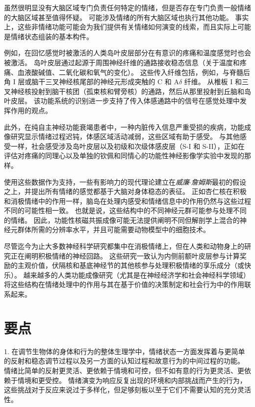 虽然很明显没有大脑区域专门负责任何特定的情绪，但是否存在专门负责一般情绪的大脑区域甚至值得怀疑。
可能涉及情绪的所有大脑区域也执行其他功能。
事实上，这些非情绪功能可能会为我们提供有关情绪如何演变的线索，而且实际上可能是情绪状态组装的基本构件。


例如，在回忆感觉时被激活的人类岛叶皮层部分在有意识的疼痛和温度感觉时也会被激活。
岛叶皮层通过起源于周围神经纤维的通路接收稳态信息（关于温度和疼痛、血液酸碱值、二氧化碳和氧气的变化）。
这些传入纤维包括，例如，与脊髓后角 I 层或脑干三叉神经核尾部的神经元形成突触的 C 和 A$ \delta $ 纤维。
从椎板 I 和三叉神经核投射到脑干核团（孤束核和臂旁核）的通路，然后从那里投射到丘脑和岛叶皮层。
该功能系统的识别进一步支持了传入体感通路中的信号在感觉处理中发挥作用的观点。


此外，在纯自主神经功能衰竭患者中，一种内脏传入信息严重受损的疾病，功能成像研究显示情绪过程迟钝，体感区域活动减弱，这些区域有助于感受。
与其他感受一样，社会感受涉及岛叶皮层以及初级和次级体感皮层（S-I 和 S-II），正如在评估对疼痛的同理心以及单独的钦佩和同情心的功能性神经影像学实验中发现的那样。


使用这些数据作为支持，一些有影响力的现代理论建立在\textit{威廉$\cdot$詹姆斯}最初的假设之上，并提出所有情绪的感觉都基于大脑对身体稳态的表征。
正如杏仁核在积极和消极情绪中的作用一样，脑岛在处理内感受和情绪信息中的作用仍然与这些过程不同的可能性相一致。
也就是说，这些结构中的不同神经元群可能参与处理不同的情绪。
因此，功能性核磁共振成像可能无法提供阐明不同但解剖学上混合的神经元群体所需的分辨率水平，并且可能需要动物模型中的细胞技术。


尽管迄今为止大多数神经科学研究都集中在消极情绪上，但在人类和动物身上的研究正在阐明积极情绪的神经回路。
这些研究一致认为内侧前额叶皮层参与计算奖励的主观价值，伏隔核和基底神经节的其他核参与处理积极情绪的享乐成分（或快乐）。
越来越多的人类功能成像研究（尤其是在神经经济学和社会神经科学领域）将这些结构在情绪处理中的作用与其在基于价值的决策制定和社会行为中的作用联系起来。



\section{要点}

1. 在调节生物体的身体和行为的整体生理学中，情绪状态一方面发挥着与更简单的反射和稳态调节过程以及另一方面的认知过程和故意行为的中间过程的功能。
情绪比简单的反射更灵活、更依赖于情境和可控，但不如有意的行为更灵活、更依赖于情境和更受控。
情绪演变为响应反复出现的环境和内部挑战而产生的行为，这些挑战对于反应来说过于多样化，但足够刻板以至于它们不需要认知的充分灵活性。


